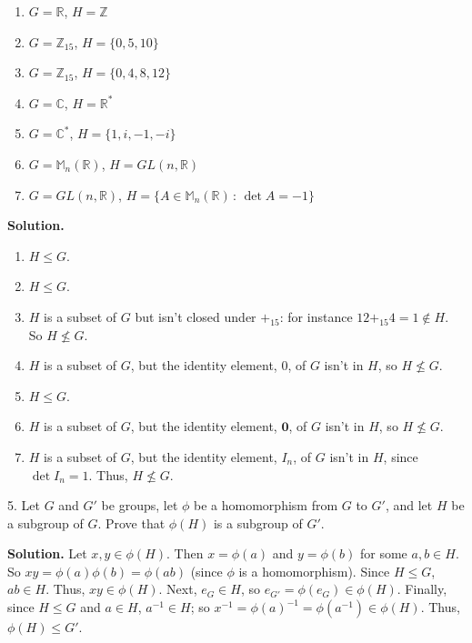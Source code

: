 \documentclass[10pt,]{book}
\theoremstyle{plain}
\theoremstyle{definition}
\theoremstyle{definition}
\theoremstyle{definition}
\theoremstyle{definition}
\numberwithin{equation}{section}
\def\Z{\mathbb{Z}}
\def\R{\mathbb{R}}
\def\C{\mathbb{C}}
\def\M{\mathbb{M}}
\def\0{\mathbf 0}
\begin{document}
\begin{exerciselist}
\begin{enumerate}[label=(\alph*)]
\item\hypertarget{li-233}{}\(G=\R\), \(H=\Z\)%
\item\hypertarget{li-234}{}\(G=\Z_{15}\), \(H=\{0,5,10\}\)%
\item\hypertarget{li-235}{}\(G=\Z_{15}\), \(H=\{0,4,8,12\}\)%
\item\hypertarget{li-236}{}\(G=\C\), \(H=\R^*\)%
\item\hypertarget{li-237}{}\(G=\C^*\), \(H=\{1,i,-1,-i\}\)%
\item\hypertarget{li-238}{}\(G=\M_n(\R)\), \(H=GL(n,\R)\)%
\item\hypertarget{li-239}{}\(G=GL(n,\R)\), \(H=\{A\in \M_n(\R)\,:\,\det A = -1\}\)%
\end{enumerate}
%
\par\smallskip
\par\smallskip
\noindent\textbf{Solution.}\hypertarget{solution-31}{}\quad
\leavevmode%
\begin{enumerate}[label=(\alph*)]
\item\hypertarget{li-240}{}\(H \leq G\). %
\item\hypertarget{li-241}{}\(H\leq G\).%
\item\hypertarget{li-242}{}\(H\) is a subset of \(G\) but isn't closed under \(+_{15}\): for instance \(12+_{15}4=1\not\in H\).  So \(H\not\leq G\).%
\item\hypertarget{li-243}{}\(H\) is a subset of \(G\), but the identity element, 0, of \(G\) isn't in \(H\), so \(H\not\leq G\).%
\item\hypertarget{li-244}{}\(H\leq G\).%
\item\hypertarget{li-245}{}\(H\) is a subset of \(G\), but the identity element, \(\0\), of \(G\) isn't in \(H\), so \(H\not\leq G\).%
\item\hypertarget{li-246}{}\(H\) is a subset of \(G\), but the identity element, \(I_n\), of \(G\) isn't in \(H\), since \(\det I_n=1\).  Thus, \(H\not\leq G\).%
\end{enumerate}
%
\item[5.]\hypertarget{exercise-32}{}Let \(G\) and \(G'\) be groups, let \(\phi\) be a homomorphism from \(G\) to \(G'\), and let \(H\) be a subgroup of \(G\). Prove that \(\phi(H)\) is a subgroup of \(G'\).%
\par\smallskip
\par\smallskip
\noindent\textbf{Solution.}\hypertarget{solution-32}{}\quad
Let \(x,y\in \phi(H)\). Then \(x=\phi(a)\) and \(y=\phi(b)\) for some \(a,b\in H\). So \(xy=\phi(a)\phi(b)=\phi(ab)\) (since \(\phi\) is a homomorphism). Since \(H\leq G\), \(ab\in H\). Thus, \(xy\in \phi(H)\). Next, \(e_G\in H\), so \(e_{G'}=\phi(e_G)\in \phi(H)\). Finally, since \(H\leq G\) and \(a\in H\), \(a^{-1}\in H\); so \(x^{-1}=\phi(a)^{-1}=\phi(a^{-1}) \in \phi(H)\). Thus, \(\phi(H)\leq G'\).%

\end{exerciselist}
\end{document}
